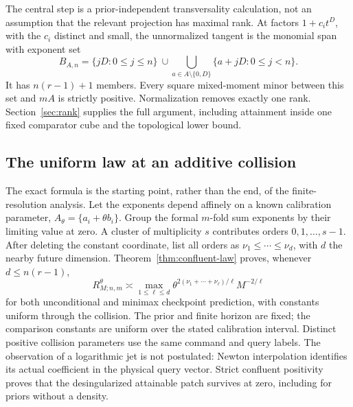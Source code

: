 The central step is a prior-independent transversality calculation, not
an assumption that the relevant projection has maximal rank. At factors
$1+c_i t^D$, with the $c_i$ distinct and small, the unnormalized tangent
is the monomial span with exponent set
\[
 B_{A,n}=\{jD:0\le j\le n\}
 \ \cup\!\!\bigcup_{a\in A\setminus\{0,D\}}
                  \{a+jD:0\le j<n\}.
\]
It has $n(r-1)+1$ members. Every square mixed-moment minor between this
set and $mA$ is strictly positive. Normalization removes exactly one rank.
Section~\ref{sec:rank} supplies the full argument, including attainment
inside one fixed comparator cube and the topological lower bound.


\subsection{The uniform law at an additive collision}
The exact formula is the starting point, rather than the end, of the
finite-resolution analysis. Let the exponents depend affinely on a known
calibration parameter, $A_\theta=\{a_i+\theta b_i\}$. Group the
formal $m$-fold sum exponents by their limiting value at zero. A cluster
of multiplicity $s$ contributes orders $0,1,\ldots,s-1$. After deleting
the constant coordinate, list all orders as
$\nu_1\le\cdots\le\nu_d$, with $d$ the nearby future dimension.
Theorem~\ref{thm:confluent-law} proves, whenever $d\le n(r-1)$,
\begin{equation}\label{eq:intro-confluent}
 R_{M;n,m}^\theta\asymp
 \max_{1\le\ell\le d}
       \theta^{2(\nu_1+\cdots+\nu_\ell)/\ell}M^{-2/\ell}
\end{equation}
for both unconditional and minimax checkpoint prediction, with constants
uniform through the collision. The prior and finite horizon are fixed; the comparison constants are
uniform over the stated calibration interval. Distinct positive collision parameters use the same command
and query labels. The observation of a logarithmic jet is not postulated:
Newton interpolation identifies its actual coefficient in the physical
query vector. Strict confluent positivity proves that the desingularized
attainable patch survives at zero, including for priors without a density.

